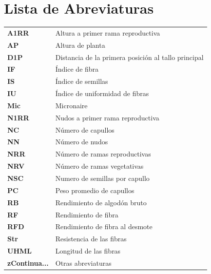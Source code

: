\documentclass[12pt,oneside]{reedthesis}
\begin{document}
\chapter*{Lista de Abreviaturas}
\begin{table}[h]
    \centering
    \begin{tabular}{ll}
                \textbf{A1RR} & Altura a primer rama reproductiva \\
                \textbf{AP} & Altura de planta \\
                \textbf{D1P} & Distancia de la primera posición al tallo principal \\
                \textbf{IF} & Índice de fibra \\
                \textbf{IS} & Índice de semillas \\
                \textbf{IU} & Índice de uniformidad de fibras \\
                \textbf{Mic} & Micronaire \\
                \textbf{N1RR} & Nudos a primer rama reproductiva \\
                \textbf{NC} & Número de capullos \\
                \textbf{NN} & Número de nudos \\
                \textbf{NRR} & Número de ramas reproductivas \\
                \textbf{NRV} & Número de ramas vegetativas \\
                \textbf{NSC} & Numero de semillas por capullo \\
                \textbf{PC} & Peso promedio de capullos \\
                \textbf{RB} & Rendimiento de algodón bruto \\
                \textbf{RF} & Rendimiento de fibra \\
                \textbf{RFD} & Rendimiento de fibra al desmote \\
                \textbf{Str} & Resistencia de las fibras \\
                \textbf{UHML} & Longitud de las fibras \\
                \textbf{zContinua...} & Otras abreviaturas \\
            \end{tabular}
\end{table}
\thispagestyle{fancy} %
    \fancyhf{} %
    \fancyhead{} %
    \fancyfoot[R]{\thepage} %
\end{document}
